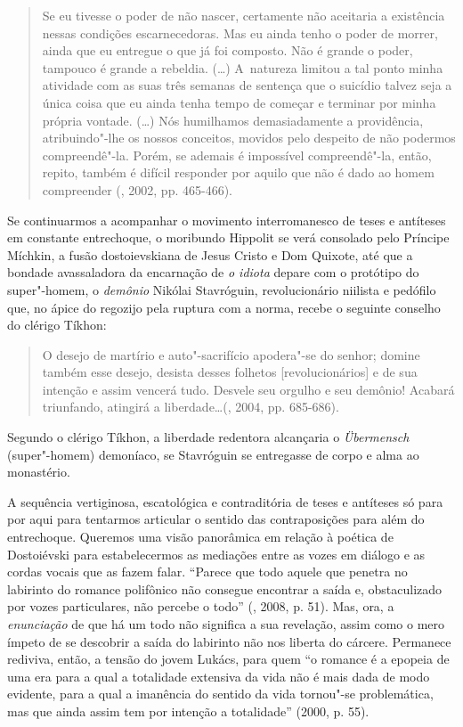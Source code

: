 \begin{quote}
Se eu tivesse o poder de não nascer, certamente não aceitaria a
existência nessas condições escarnecedoras. Mas eu ainda tenho o poder
de morrer, ainda que eu entregue o que já foi composto. Não é grande o
poder, tampouco é grande a rebeldia. (\ldots) A~natureza limitou a tal
ponto minha atividade com as suas três semanas de sentença que o
suicídio talvez seja a única coisa que eu ainda tenha tempo de começar e
terminar por minha própria vontade. (\ldots) Nós humilhamos demasiadamente
a providência, atribuindo"-lhe os nossos conceitos, movidos pelo despeito
de não podermos compreendê"-la. Porém, se ademais é impossível
compreendê"-la, então, repito, também é difícil responder por aquilo que
não é dado ao homem compreender (, 2002, pp. 465-466).
\end{quote}

Se continuarmos a acompanhar o movimento interromanesco de teses e
antíteses em constante entrechoque, o moribundo Hippolit se verá
consolado pelo Príncipe Míchkin, a fusão dostoievskiana de Jesus Cristo
e Dom Quixote, até que a bondade avassaladora da encarnação de \emph{o
idiota} depare com o protótipo do super"-homem, o \emph{demônio} Nikólai
Stavróguin, revolucionário niilista e pedófilo que, no ápice do regozijo
pela ruptura com a norma, recebe o seguinte conselho do clérigo Tíkhon:

\begin{quote}
O desejo de martírio e auto"-sacrifício apodera"-se do senhor; domine
também esse desejo, desista desses folhetos {[}revolucionários{]} e de
sua intenção e assim vencerá tudo. Desvele seu orgulho e seu demônio!
Acabará triunfando, atingirá a liberdade\ldots (, 2004, pp.
685-686).
\end{quote}

Segundo o clérigo Tíkhon, a liberdade redentora alcançaria o
\emph{Übermensch} (super"-homem) demoníaco, se Stavróguin se entregasse
de corpo e alma ao monastério.

A sequência vertiginosa, escatológica e contraditória de teses e
antíteses só para por aqui para tentarmos articular o sentido das
contraposições para além do entrechoque. Queremos uma visão panorâmica
em relação à poética de Dostoiévski para estabelecermos as mediações
entre as vozes em diálogo e as cordas vocais que as fazem falar.
``Parece que todo aquele que penetra no labirinto do romance polifônico
não consegue encontrar a saída e, obstaculizado por vozes particulares,
não percebe o todo'' (, 2008, p. 51). Mas, ora, a
\emph{enunciação} de que há um todo não significa a sua revelação, assim
como o mero ímpeto de se descobrir a saída do labirinto não nos liberta
do cárcere. Permanece rediviva, então, a tensão do jovem Lukács, para
quem ``o romance é a epopeia de uma era para a qual a totalidade
extensiva da vida não é mais dada de modo evidente, para a qual a
imanência do sentido da vida tornou"-se problemática, mas que ainda assim
tem por intenção a totalidade'' (2000, p. 55).

